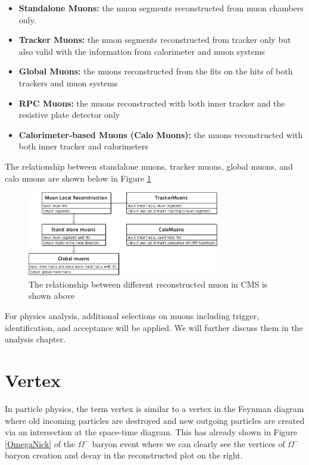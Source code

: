 \begin{itemize}
\item \textbf{Standalone Muons:} the muon segments reconstructed from muon chambers only.
\item \textbf{Tracker Muons:} the muon segments reconstructed from tracker only but also valid with the information from calorimeter and muon systems
\item \textbf{Global Muons:} the muons reconstructed from the fits on the hits of both trackers and muon systems
\item \textbf{RPC Muons:} the muons reconstructed with both inner tracker and the resistive plate detector only 
\item \textbf{Calorimeter-based Muons (Calo Muons):} the muons reconstructed with both inner tracker and calorimeters  
\end{itemize}

The relationship between standalone muons, tracker muons, global muons, and calo muons are shown below in Figure \ref{MuonRel}

\begin{figure}[hbtp]
\begin{center}
\includegraphics[width=0.75\textwidth]{Figures/Chapter4/MuonRel}
\caption{The relationship between different reconstructed muon in CMS is shown above}
\label{MuonRel}
\end{center}
\end{figure} 

For physics analysis, additional selections on muons including trigger, identification, and acceptance will be applied. We will further discuss them in the analysis chapter.

\section{Vertex}

In particle physics, the term vertex is similar to a vertex in the Feynman diagram where old incoming particles are destroyed and new outgoing particles are created via an intersection at the space-time diagram. This has already shown in Figure \ref{OmegaNick} of the $\Omega^-$ baryon event where we can clearly see the vertices of $\Omega^-$ baryon creation and decay in the reconstructed plot on the right. 

